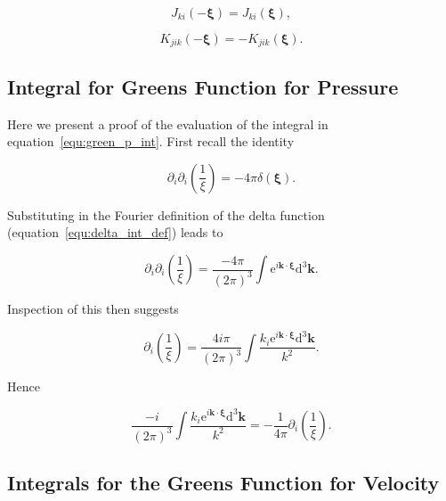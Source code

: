 \documentclass[12pt]{article}
\begin{document}
\begin{equation}
\label{equ:j_sym}
J_{ki}(-\boldsymbol\xi) = J_{ki}(\boldsymbol\xi),
\end{equation}

\begin{equation}
\label{equ:k_sym}
K_{jik}(-\boldsymbol\xi) = -K_{jik}(\boldsymbol\xi).
\end{equation}


\subsection{Integral for Greens Function for Pressure}
\label{sub_app:green_p}

Here we present a proof of the evaluation of the integral in equation~\ref{equ:green_p_int}. First recall the identity \citep{Jackson99, Frahm82}

\begin{equation}
\label{equ:laplace_recip_squared}
\partial_{i} \partial_{i}\left(\frac{1}{\xi}\right) = -4 \pi \delta(\boldsymbol{\xi}).
\end{equation}


Substituting in the Fourier definition of the delta function (equation~\ref{equ:delta_int_def}) leads to

\begin{equation}
\label{equ:del_square_recip}
\partial_{i} \partial_{i} \left(\frac{1}{\xi}\right) = \frac{-4 \pi}{(2 \pi)^{3}} \int \mathrm{e}^{i \boldsymbol{k} \cdot \boldsymbol{\xi}} \mathrm{d}^{3} \boldsymbol{k} .
\end{equation}

Inspection of this then suggests

\begin{equation}
\label{equ:grad_recip}
\partial_{i} \left(\frac{1}{\xi}\right) = \frac{4 i \pi}{(2 \pi)^{3}} \int \frac{ k_{i} \mathrm{e}^{i \boldsymbol{k} \cdot \boldsymbol{\xi}} \mathrm{d}^{3} \boldsymbol{k}}{k^{2}} .
\end{equation}

Hence

\begin{equation}
\label{equ:green_p_ident}
\frac{-i}{(2 \pi)^{3}} \int \frac{ k_{i} \mathrm{e}^{i \boldsymbol{k} \cdot \boldsymbol{\xi}} \mathrm{d}^{3} \boldsymbol{k}}{k^{2}} = -\frac{1}{4 \pi} \partial_{i} \left(\frac{1}{\xi}\right) .
\end{equation}

\subsection{Integrals for the Greens Function for Velocity}
\label{sub_app:green_vel}
\end{document}
